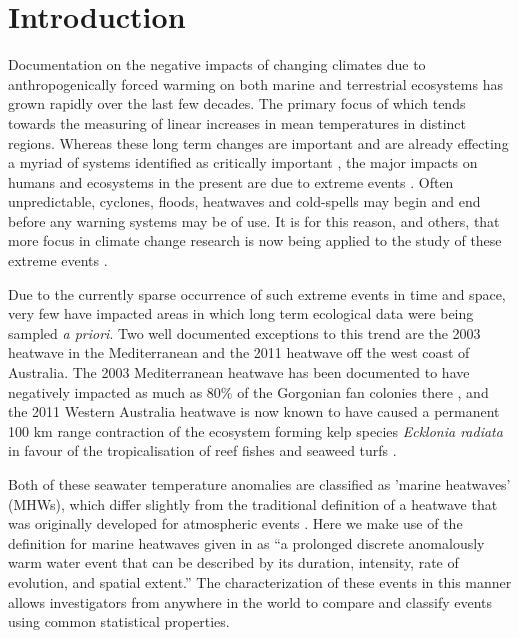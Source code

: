 \documentclass[a4paper,10pt,review]{elsarticle}
\begin{document}
\linenumbers

\section{Introduction}
Documentation on the negative impacts of changing climates due to anthropogenically forced warming on both marine and terrestrial ecosystems has grown rapidly over the last few decades. The primary focus of which tends towards the measuring of linear increases in mean temperatures in distinct regions. Whereas these long term changes are important and are already effecting a myriad of systems identified as critically important \citep{IPCC2014}, the major impacts on humans and ecosystems in the present are due to extreme events \citep{Easterling2000}. Often unpredictable, cyclones, floods, heatwaves and cold-spells may begin and end before any warning systems may be of use. It is for this reason, and others, that more focus in climate change research is now being applied to the study of these extreme events \citep{Jentsch2007}.

Due to the currently sparse occurrence of such extreme events in time and space, very few have impacted areas in which long term ecological data were being sampled \emph{a priori}. Two well documented exceptions to this trend are the 2003 heatwave in the Mediterranean and the 2011 heatwave off the west coast of Australia. The 2003 Mediterranean heatwave has been documented to have negatively impacted as much as 80\% of the Gorgonian fan colonies there \citep{Garrabou2009}, and the 2011 Western Australia heatwave is now known to have caused a permanent 100 km range contraction of the ecosystem forming kelp species \emph{Ecklonia radiata} in favour of the tropicalisation of reef fishes and seaweed turfs \citep{Wernberg2016}.

Both of these seawater temperature anomalies are classified as 'marine heatwaves' (MHWs), which differ slightly from the traditional definition of a heatwave that was originally developed for atmospheric events \citep{Perkins2013}. Here we make use of the definition for marine heatwaves given in \citet{Hobday2016} as ``a prolonged discrete anomalously warm water event that can be described by its duration, intensity, rate of evolution, and spatial extent.'' The characterization of these events in this manner allows investigators from anywhere in the world to compare and classify events using common statistical properties.
\end{document}
